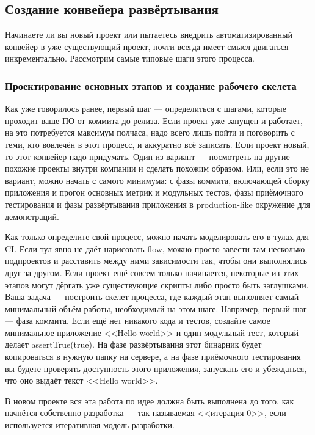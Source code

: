 \documentclass{../../text-style}
\begin{document}
\subsection{Создание конвейера развёртывания}

Начинаете ли вы новый проект или пытаетесь внедрить автоматизированный конвейер в уже существующий проект, почти всегда имеет смысл двигаться инкрементально. Рассмотрим самые типовые шаги этого процесса.

\subsubsection{Проектирование основных этапов и создание рабочего скелета}

Как уже говорилось ранее, первый шаг --- определиться с шагами, которые проходит ваше ПО от коммита до релиза. Если проект уже запущен и работает, на это потребуется максимум полчаса, надо всего лишь пойти и поговорить с теми, кто вовлечён в этот процесс, и аккуратно всё записать. Если проект новый, то этот конвейер надо придумать. Один из вариант --- посмотреть на другие похожие проекты внутри компании и сделать похожим образом. Или, если это не вариант, можно начать с самого минимума: с фазы коммита, включающей сборку приложения и прогон основных метрик и модульных тестов, фазы приёмочного тестирования и фазы развёртывания приложения в production-like окружение для демонстраций.

Как только определите свой процесс, можно начать моделировать его в тулах для CI. Если тул явно не даёт нарисовать flow, можно просто завести там несколько подпроектов и расставить между ними зависимости так, чтобы они выполнялись друг за другом. Если проект ещё совсем только начинается, некоторые из этих этапов могут дёргать уже существующие скрипты либо просто быть заглушками. Ваша задача --- построить скелет процесса, где каждый этап выполняет самый минимальный объём работы, необходимый на этом шаге. Например, первый шаг --- фаза коммита. Если ещё нет никакого кода и тестов, создайте самое минимальное приложение <<Hello world>> и один модульный тест, который делает assertTrue(true). На фазе развёртывания этот бинарник будет копироваться в нужную папку на сервере, а на фазе приёмочного тестирования вы будете проверять доступность этого приложения, запускать его и убеждаться, что оно выдаёт текст <<Hello world>>.

В новом проекте вся эта работа по идее должна быть выполнена до того, как начнётся собственно разработка --- так называемая <<итерация 0>>, если используется итеративная модель разработки.
\end{document}
